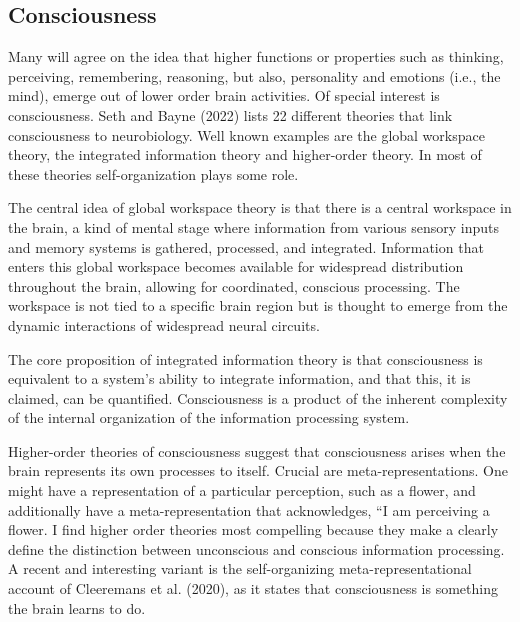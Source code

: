 \documentclass[
  a4paper,
  DIV=11,
  numbers=noendperiod,
  oneside]{scrreprt}
\begin{document}
\hypertarget{sec-Consciousness}{%
\subsection{Consciousness}\label{sec-Consciousness}}

Many will agree on the idea that higher functions or properties such as
thinking, perceiving, remembering, reasoning, but also, personality and
emotions (i.e., the mind), emerge out of lower order brain activities.
Of special interest is consciousness. Seth and Bayne (2022) lists 22
different theories that link consciousness to neurobiology. Well known
examples are the global workspace theory, the integrated information
theory and higher-order theory. In most of these theories
self-organization plays some role.

The central idea of global workspace theory is that there is a central
workspace in the brain, a kind of mental stage where information from
various sensory inputs and memory systems is gathered, processed, and
integrated. Information that enters this global workspace becomes
available for widespread distribution throughout the brain, allowing for
coordinated, conscious processing. The workspace is not tied to a
specific brain region but is thought to emerge from the dynamic
interactions of widespread neural circuits.

The core proposition of integrated information theory is that
consciousness is equivalent to a system's ability to integrate
information, and that this, it is claimed, can be quantified.
Consciousness is a product of the inherent complexity of the internal
organization of the information processing system.

Higher-order theories of consciousness suggest that consciousness arises
when the brain represents its own processes to itself. Crucial are
meta-representations. One might have a representation of a particular
perception, such as a flower, and additionally have a
meta-representation that acknowledges, ``I am perceiving a flower. I
find higher order theories most compelling because they make a clearly
define the distinction between unconscious and conscious information
processing. A recent and interesting variant is the self-organizing
meta-representational account of Cleeremans et al. (2020), as it states
that consciousness is something the brain learns to do.
\end{document}
